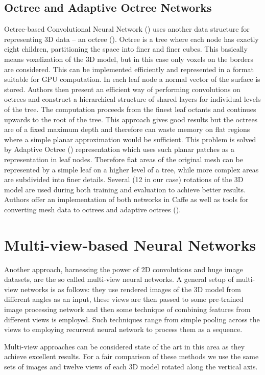 


\subsection{Octree and Adaptive Octree Networks}
Octree-based Convolutional Neural Network (\cite{wang_o-cnn:_2017}) uses another data structure for representing 3D data -- an octree (\cite{meagher_octree_1980}). Octree is a tree where each node has exactly eight children, partitioning the space into finer and finer cubes. This basically means voxelization of the 3D model, but in this case only voxels on the borders are considered. This can be implemented efficiently and represented in a format suitable for GPU computation. In each leaf node a normal vector of the surface is stored. Authors then present an efficient way of performing convolutions on octrees and construct a hierarchical structure of shared layers for individual levels of the tree. The computation proceeds from the finest leaf octants and continues upwards to the root of the tree.
This approach gives good results but the octrees are of a fixed maximum depth and therefore can waste memory on flat regions where a simple planar approximation would be sufficient. This problem is solved by Adaptive Octree (\cite{wang_adaptive_2018}) representation which uses such planar patches as a representation in leaf nodes. Therefore flat areas of the original mesh can be represented by a simple leaf on a higher level of a tree, while more complex areas are subdivided into finer details. 
Several (12 in our case) rotations of the 3D model are used during both training and evaluation to achieve better results.
Authors offer an implementation of both networks in Caffe as well as tools for converting mesh data to octrees and adaptive octrees (\cite{wang_o-cnn_2018}).

\section{Multi-view-based Neural Networks}
Another approach, harnessing the power of 2D convolutions and huge image datasets, are the so called multi-view neural networks.
A general setup of multi-view networks is as follows: they use rendered images of the 3D model from different angles as an input, these views are then passed to some pre-trained image processing network and then some technique of combining features from different views is employed. Such techniques range from simple pooling across the views to employing recurrent neural network to process them as a sequence.\par
Multi-view approaches can be considered state of the art in this area as they achieve excellent results. For a fair comparison of these methods we use the same sets of images and twelve views of each 3D model rotated along the vertical axis.

